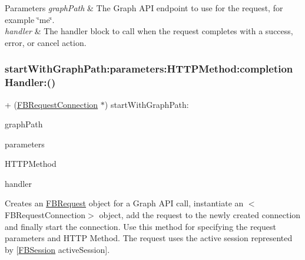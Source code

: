 \begin{DoxyParams}{Parameters}
{\em graph\+Path} & The Graph A\+PI endpoint to use for the request, for example \char`\"{}me\char`\"{}. \\
\hline
{\em handler} & The handler block to call when the request completes with a success, error, or cancel action. \\
\hline
\end{DoxyParams}
\mbox{\label{interfaceFBRequestConnection_aff0e9852584fcd2c81eb7f4751ef0ee2}} 
\subsubsection{\texorpdfstring{start\+With\+Graph\+Path\+:parameters\+:\+H\+T\+T\+P\+Method\+:completion\+Handler\+:()}{startWithGraphPath:parameters:HTTPMethod:completionHandler:()}\hspace{0.1cm}{\footnotesize\ttfamily [1/5]}}
{\footnotesize\ttfamily + (\hyperlink{interfaceFBRequestConnection}{F\+B\+Request\+Connection} $\ast$) start\+With\+Graph\+Path\+: \begin{DoxyParamCaption}\item[{(N\+S\+String $\ast$)}]{graph\+Path }\item[{parameters:(N\+S\+Dictionary $\ast$)}]{parameters }\item[{HTTPMethod:(N\+S\+String $\ast$)}]{H\+T\+T\+P\+Method }\item[{completionHandler:(F\+B\+Request\+Handler)}]{handler }\end{DoxyParamCaption}}

Creates an {\ttfamily \hyperlink{interfaceFBRequest}{F\+B\+Request}} object for a Graph A\+PI call, instantiate an $<$\+F\+B\+Request\+Connection$>$ object, add the request to the newly created connection and finally start the connection. Use this method for specifying the request parameters and H\+T\+TP Method. The request uses the active session represented by {\ttfamily \mbox{[}\hyperlink{interfaceFBSession}{F\+B\+Session} active\+Session\mbox{]}}.



